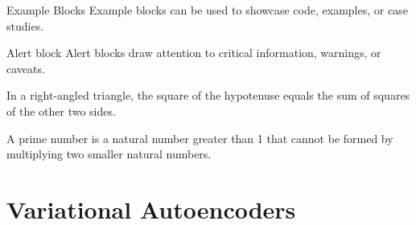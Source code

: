 \documentclass[aspectratio=169,xcolor=dvipsnames]{beamer}
\begin{document}
\begin{frame}{}

  \begin{exampleblock}{Example Blocks}
    Example blocks can be used to showcase code, examples, or case studies.
  \end{exampleblock}
  
  \begin{alertblock}{Alert block}
    Alert blocks draw attention to critical information, warnings, or caveats.
  \end{alertblock}
  
  \begin{theorem}
    In a right-angled triangle, the square of the hypotenuse equals the sum of squares of the other two sides.
  \end{theorem}
  
  \begin{definition}
    A prime number is a natural number greater than 1 that cannot be formed by multiplying two smaller natural numbers.
  \end{definition}
\end{frame}

\section{Variational Autoencoders}
\end{document}
